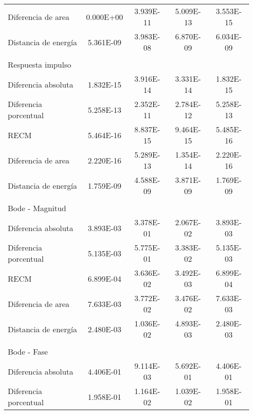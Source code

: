 {\begin{longtable}{l @{\extracolsep{\fill}} cccc}
            Diferencia de area     & \num{0.000E+00} & \num{3.939E-11} & \num{5.009E-13} & \num{3.553E-15}  \\
            Distancia de energía   & \num{5.361E-09} & \num{3.983E-08} & \num{6.870E-09} & \num{6.034E-09}  \\
            & & & & \\
            Respuesta impulso      & & & & \\ \cmidrule{1-1}
            Diferencia absoluta    & \num{1.832E-15} & \num{3.916E-14} & \num{3.331E-14} & \num{1.832E-15}  \\
            Diferencia porcentual  & \num{5.258E-13} & \num{2.352E-11} & \num{2.784E-12} & \num{5.258E-13}  \\
            RECM                   & \num{5.464E-16} & \num{8.837E-15} & \num{9.464E-15} & \num{5.485E-16}  \\
            Diferencia de area     & \num{2.220E-16} & \num{5.289E-13} & \num{1.354E-14} & \num{2.220E-16}  \\
            Distancia de energía   & \num{1.759E-09} & \num{4.588E-09} & \num{3.871E-09} & \num{1.769E-09}  \\
            & & & & \\
            Bode - Magnitud        & & & & \\ \cmidrule{1-1}
            Diferencia absoluta    & \num{3.893E-03} & \num{3.378E-01} & \num{2.067E-02} & \num{3.893E-03}  \\
            Diferencia porcentual  & \num{5.135E-03} & \num{5.775E-01} & \num{3.383E-02} & \num{5.135E-03}  \\
            RECM                   & \num{6.899E-04} & \num{3.636E-02} & \num{3.492E-03} & \num{6.899E-04}  \\
            Diferencia de area     & \num{7.633E-03} & \num{3.772E-02} & \num{3.476E-02} & \num{7.633E-03}  \\
            Distancia de energía   & \num{2.480E-03} & \num{1.036E-02} & \num{4.893E-03} & \num{2.480E-03}  \\
            & & & & \\
            Bode - Fase            & & & & \\ \cmidrule{1-1}
            Diferencia absoluta    & \num{4.406E-01} & \num{9.114E-03} & \num{5.692E-01} & \num{4.406E-01}  \\
            Diferencia porcentual  & \num{1.958E-01} & \num{1.164E-02} & \num{1.039E-02} & \num{1.958E-01}  \\

\end{longtable}}
